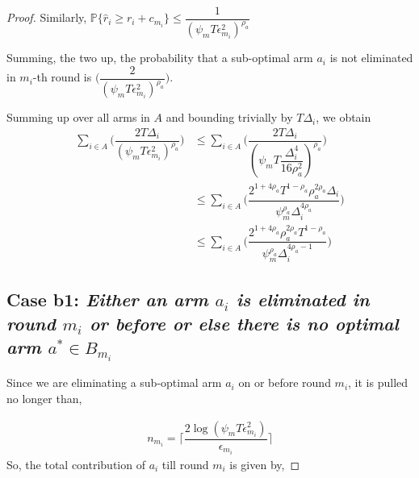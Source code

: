 \begin{proof}
 
Similarly, $\mathbb{P}\lbrace\hat{r}_{i}\geq r_{i} + c_{m_{i}}\rbrace\leq \dfrac{1}{(\psi_{m}T\epsilon_{m_{i}}^{2})^{\rho_{a}}}$
 
Summing, the two up, the probability that a sub-optimal arm $a_{i}$ is not eliminated in $m_{i}$-th round is  $\bigg(\dfrac{2}{(\psi_{m}T\epsilon_{m_{i}}^{2})^{\rho_{a}}}\bigg)$. 
 
Summing up over all arms in $A$ and bounding trivially by $T\Delta_{i}$, we obtain
   \begin{align*}
\sum_{i\in A}\bigg(\dfrac{2T\Delta_{i}}{(\psi_{m}T\epsilon_{m_{i}}^{2})^{\rho_{a}}}\bigg)
&\leq\sum_{i\in A}\bigg(\dfrac{2T\Delta_{i}}{(\psi_{m}T\dfrac{\Delta_{i}^{4}}{16\rho_{a}^{2}})^{\rho_{a}}}\bigg)\\
&\leq \sum_{i\in A}\bigg(\dfrac{2^{1+4\rho_{a}}T^{1-\rho_{a}}\rho_{a}^{2\rho_{a}}\Delta_{i}}{\psi_{m}^{\rho_{a}}\Delta_{i}^{4\rho_{a}}}\bigg)\\
&\leq \sum_{i\in A}\bigg(\dfrac{2^{1+4\rho_{a}}\rho_{a}^{2\rho_{a}}T^{1-\rho_{a}}}{\psi_{m}^{\rho_{a}}\Delta_{i}^{4\rho_{a}-1}}\bigg)    
   \end{align*}

% 



\subsection*{Case b1: \textit{Either an arm $a_{i}$ is eliminated in round $m_{i}$ or before or else there is no optimal arm $a^{*}\in B_{m_{i}}$ }}
 Since we are eliminating a sub-optimal arm $a_{i}$ on or before round $m_{i}$, it is pulled no longer than,
 
 \begin{align*}
 n_{m_{i}}=\bigg\lceil\dfrac{2\log{(\psi_{m}T\epsilon_{m_{i}}^{2})}}{\epsilon_{m_{i}}}\bigg\rceil
 \end{align*}
So, the total contribution of $a_{i}$  till round $m_{i}$ is given by,
 

\end{proof}
